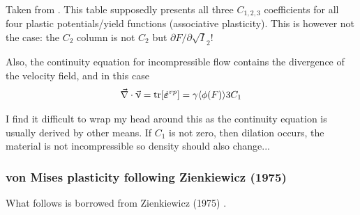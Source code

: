 \begin{center}
\\
{\captionfont Taken from \textcite{owhi}.
This table supposedly presents all three $C_{1,2,3}$ coefficients 
for all four plastic potentials/yield functions (associative plasticity).
This is however not the case: the $C_2$ column is not $C_2$ but 
$\partial F/\partial\sqrt I_2$!
}
\end{center}


Also, the continuity equation for incompressible flow contains the divergence 
of the velocity field, and in this case 
\[
\vec\nabla\cdot\vec\upnu = {\rm tr}[\dot{\bm\varepsilon}^{vp}] =  \gamma \langle \phi(F) \rangle  3 C_1
\]

I find it difficult to wrap my head around this as the continuity equation 
is usually derived by other means. 
If $C_1$ is not zero, then dilation occurs, the material is not incompressible
so density should also change...  


\subsubsection{von Mises plasticity following Zienkiewicz (1975)}

What follows is borrowed from Zienkiewicz (1975) \cite{zien75}.


